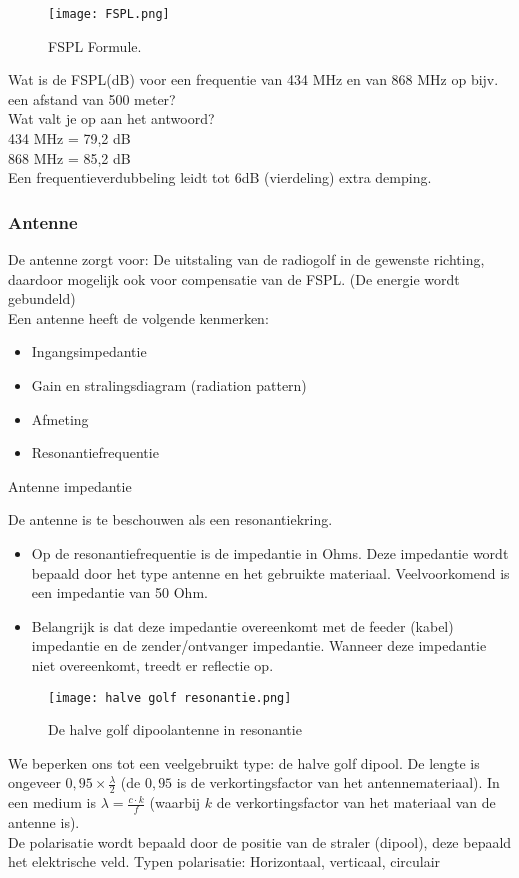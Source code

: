 \begin{figure}[H]
    \centering
    \texttt{[image: FSPL.png]}
    \caption{FSPL Formule.}
    \end{figure}

Wat is de FSPL(dB) voor een frequentie van 434 MHz en van 868 MHz op bijv. een afstand van 500 meter?\\
Wat valt je op aan het antwoord?\\
434 MHz = 79,2 dB\\
868 MHz = 85,2 dB\\
Een frequentieverdubbeling leidt tot 6dB (vierdeling) extra demping.

\subsubsection{Antenne}
De antenne zorgt voor: De uitstaling van de radiogolf in de gewenste richting, daardoor mogelijk ook voor compensatie van de FSPL. (De energie wordt gebundeld)\\

Een antenne heeft de volgende kenmerken:
\begin{itemize}
  \item Ingangsimpedantie
  \item Gain en stralingsdiagram (radiation pattern)
  \item Afmeting
  \item Resonantiefrequentie
\end{itemize}

Antenne impedantie

De antenne is te beschouwen als een resonantiekring.
\begin{itemize}
  \item Op de resonantiefrequentie is de impedantie in Ohms. Deze impedantie wordt bepaald door het type antenne en het gebruikte materiaal. Veelvoorkomend is een impedantie van 50 Ohm.
  \item Belangrijk is dat deze impedantie overeenkomt met de feeder (kabel) impedantie en de zender/ontvanger impedantie. Wanneer deze impedantie niet overeenkomt, treedt er reflectie op.
\end{itemize}

\begin{figure}[H]
    \centering
    \texttt{[image: halve golf resonantie.png]}
    \caption{De halve golf dipoolantenne in resonantie}
    \end{figure}

We beperken ons tot een veelgebruikt type: de halve golf dipool. De lengte is ongeveer \(0,95 \times \frac{\lambda}{2}\) (de \(0,95\) is de verkortingsfactor van het antennemateriaal).
In een medium is \(\lambda = \frac{c \cdot k}{f}\) (waarbij \(k\) de verkortingsfactor van het materiaal van de antenne is).\\

De polarisatie wordt bepaald door de positie van de straler (dipool),
deze bepaald het elektrische veld.
Typen polarisatie: Horizontaal, verticaal, circulair